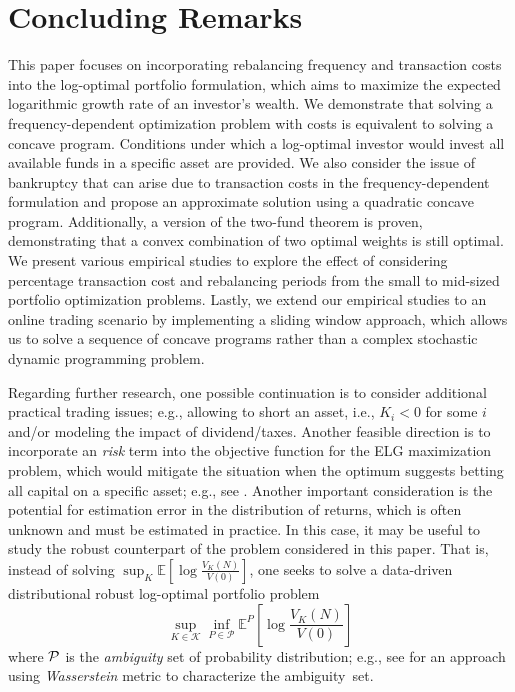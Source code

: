 \documentclass[10pt]{article} %
\begin{document}
	\section{Concluding Remarks}\label{section: Concluding remark}
	This paper focuses on incorporating rebalancing frequency and transaction costs into the log-optimal portfolio formulation, which aims to maximize the expected logarithmic growth rate of an investor's wealth. 
	We demonstrate that solving a frequency-dependent optimization problem with costs is equivalent to solving a concave program. Conditions under which a log-optimal investor would invest all available funds in a specific asset are provided. 
	We also consider the issue of bankruptcy that can arise due to transaction costs in the frequency-dependent formulation and propose an approximate solution using a quadratic concave program.
	Additionally, a version of the two-fund theorem is proven, demonstrating that a convex combination of two optimal weights is still optimal.
	We present various empirical studies to explore the effect of considering percentage transaction cost and rebalancing periods from the small to mid-sized portfolio optimization problems. 
	Lastly, we extend our empirical studies to an online trading scenario by implementing a sliding window approach, which allows us to solve a sequence of concave programs rather than a complex stochastic dynamic programming problem.
	
	
	Regarding further research, one possible continuation is to consider additional practical trading issues; e.g., allowing to short an asset, i.e., $K_i < 0$ for some $i$ and/or modeling the impact of dividend/taxes. 
	Another feasible direction is to incorporate an \textit{risk} term into the objective function for the ELG maximization problem, which would mitigate the situation when the optimum suggests betting all capital on a specific asset; e.g., see \cite{davis2008risk}.
	Another important consideration is the potential for estimation error in the distribution of returns, which is often unknown and must be estimated in practice.
	In this case, it may be useful to study the robust counterpart of the problem considered in this paper.  That is, instead of solving $\sup_K \mathbb{E}[\log \frac{V_K(N)}{V(0)}]$, one seeks to solve a data-driven distributional robust log-optimal portfolio problem  
	$$
	\sup_{K \in \mathcal{K}} \inf_{P \in \mathcal{P}} \mathbb{E}^P \left[ \log \frac{V_K(N)}{V(0)} \right] 
	$$  where $\cal P$ is the \textit{ambiguity} set of probability distribution; e.g., see \cite{mohajerin2018data, wu2022generalization} for an approach using \textit{Wasserstein} metric to characterize the ambiguity~set.  
	
\end{document}
